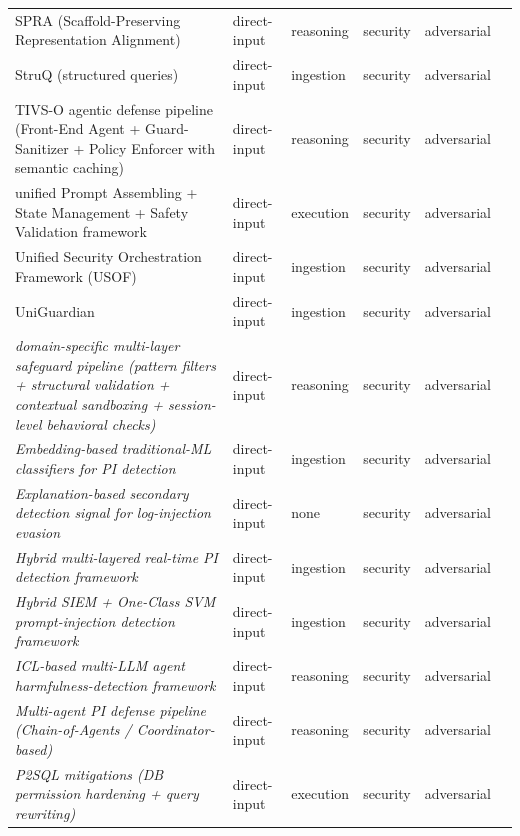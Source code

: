 \begin{longtable}{@{}p{}lllll@{}}
SPRA (Scaffold-Preserving Representation Alignment) & direct-input & reasoning & security & adversarial & \cite{shao-2026-mitigating} \\
StruQ (structured queries) & direct-input & ingestion & security & adversarial & \cite{chen-2024-struq} \\
TIVS-O agentic defense pipeline (Front-End Agent + Guard-Sanitizer + Policy Enforcer with semantic caching) & direct-input & reasoning & security & adversarial & \cite{gosmar-2026-prompt} \\
unified Prompt Assembling + State Management + Safety Validation framework & direct-input & execution & security & adversarial & \cite{zhang-2025-enhancing} \\
Unified Security Orchestration Framework (USOF) & direct-input & ingestion & security & adversarial & \cite{muthu-2026-unified} \\
UniGuardian & direct-input & ingestion & security & adversarial & \cite{lin-2025-uniguardian} \\
\emph{domain-specific multi-layer safeguard pipeline (pattern filters + structural validation + contextual sandboxing + session-level behavioral checks)} & direct-input & reasoning & security & adversarial & \cite{maiorano-2026-evaluating} \\
\emph{Embedding-based traditional-ML classifiers for PI detection} & direct-input & ingestion & security & adversarial & \cite{ayub-2024-embeddingbased} \\
\emph{Explanation-based secondary detection signal for log-injection evasion} & direct-input & none & security & adversarial & \cite{landauer-2026-just} \\
\emph{Hybrid multi-layered real-time PI detection framework} & direct-input & ingestion & security & adversarial & \cite{prakash-2026-hybrid} \\
\emph{Hybrid SIEM + One-Class SVM prompt-injection detection framework} & direct-input & ingestion & security & adversarial & \cite{alshammari-2026-detecting} \\
\emph{ICL-based multi-LLM agent harmfulness-detection framework} & direct-input & reasoning & security & adversarial & \cite{sato-2026-addressing} \\
\emph{Multi-agent PI defense pipeline (Chain-of-Agents / Coordinator-based)} & direct-input & reasoning & security & adversarial & \cite{hossain-2025-multiagent} \\
\emph{P2SQL mitigations (DB permission hardening + query rewriting)} & direct-input & execution & security & adversarial & \cite{pedro-2023-prompt} \\

\end{longtable}
